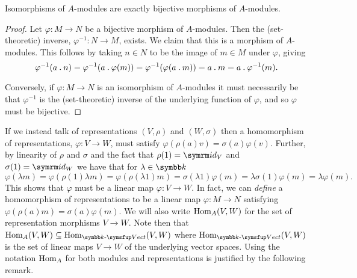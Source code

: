 \begin{lma}{}{}
    Isomorphisms of \(A\)-modules are exactly bijective morphisms of \(A\)-modules.
    \begin{proof}
        Let \(\varphi \colon M \to N\) be a bijective morphism of \(A\)-modules.
        Then the (set-theoretic) inverse, \(\varphi^{-1} \colon N \to M\), exists.
        We claim that this is a morphism of \(A\)-modules.
        This follows by taking \(n \in N\) to be the image of \(m \in M\) under \(\varphi\), giving
        \begin{equation}
            \varphi^{-1}(a \mathbin{.} n) = \varphi^{-1}(a \mathbin{.} \varphi(m)) = \varphi^{-1}(\varphi(a \mathbin{.} m)) = a \mathbin{.} m = a \mathbin{.} \varphi^{-1}(m).
        \end{equation}
        
        Conversely, if \(\varphi \colon M \to N\) is an isomorphism of \(A\)-modules it must necessarily be that \(\varphi^{-1}\) is the (set-theoretic) inverse of the underlying function of \(\varphi\), and so \(\varphi\) must be bijective.
    \end{proof}
\end{lma}

If we instead talk of representations \((V, \rho)\) and \((W, \sigma)\) then a homomorphism of representations, \(\varphi \colon V \to W\), must satisfy \(\varphi(\rho(a)v) = \sigma(a)\varphi(v)\).
Further, by linearity of \(\rho\) and \(\sigma\) and the fact that \(\rho(1) = \id_V\) and \(\sigma(1) = \id_W\) we have that for \(\lambda \in \field\)
\begin{equation}
    \varphi(\lambda m) = \varphi(\rho(1)\lambda m) = \varphi(\rho(\lambda 1) m) = \sigma(\lambda 1)\varphi(m) = \lambda \sigma(1) \varphi(m) = \lambda \varphi(m).
\end{equation}
This shows that \(\varphi\) must be a linear map \(\varphi \colon V \to W\).
In fact, we can \emph{define} a homomorphism of representations to be a linear map \(\varphi \colon M \to N\) satisfying \(\varphi(\rho(a)m) = \sigma(a)\varphi(m)\).
We will also write \(\operatorname{Hom}_A(V, W)\) for the set of representation morphisms \(V \to W\).
Note then that \(\Hom_A(V, W) \subseteq \Hom_{\Vect[\field]}(V, W)\) where \(\Hom_{\Vect[\field]}(V, W)\) is the set of linear maps \(V \to W\) of the underlying vector spaces.
Using the notation \(\operatorname{Hom}_A\) for both modules and representations is justified by the following remark.

